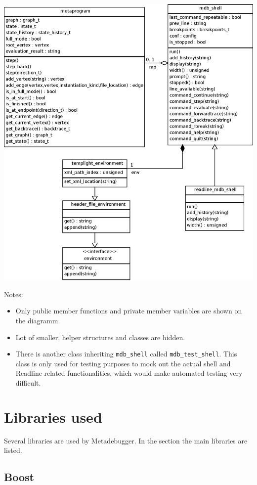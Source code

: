 \includegraphics[width=\textwidth]{img/mdb_class_diagramm.eps}

Notes:
\begin{itemize}
    \item
        Only public member functions and private member variables are shown
        on the diagramm.
    \item
        Lot of smaller, helper structures and classes are hidden.
    \item
        There is another class inheriting \texttt{mdb\_shell} called
        \texttt{mdb\_test\_shell}. This class is only used for testing
        purposes to mock out the actual shell and Readline related
        functionalities, which would make automated testing very difficult.
\end{itemize}

\section{Libraries used}

Several libraries are used by Metadebugger. In the section the main libraries
are listed.

\subsection{Boost\cite{boost}}

